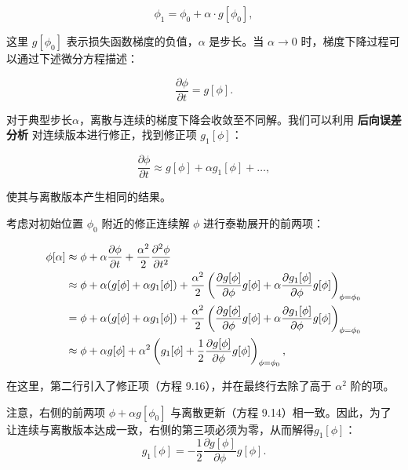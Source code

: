 \begin{equation}
\phi_1 = \phi_0 + \alpha \cdot g[\phi_0], 
\end{equation}

这里 \(g[\phi_0]\) 表示损失函数梯度的负值，\(\alpha\) 是步长。当 \(\alpha \rightarrow 0\) 时，梯度下降过程可以通过下述微分方程描述：

\begin{equation}
\frac{\partial \phi}{\partial t} = g[\phi]. 
\end{equation}

对于典型步长\(\alpha\)，离散与连续的梯度下降会收敛至不同解。我们可以利用 \textbf{后向误差分析} 对连续版本进行修正，找到修正项 \(g_1[\phi]\)：

\begin{equation}
\frac{\partial \phi}{\partial t} \approx g[\phi] + \alpha g_1[\phi] + \ldots, 
\end{equation}

使其与离散版本产生相同的结果。

考虑对初始位置  \(\phi_0\) 附近的修正连续解 \(\phi\) 进行泰勒展开的前两项：


\begin{align}
	\phi[\alpha] &\approx \phi + \alpha \frac{\partial \phi}{\partial t} + \frac{\alpha^2}{2} \frac{\partial^2 \phi}{\partial t^2} \notag \\
	&\approx \phi + \alpha (g[\phi] + \alpha g_1[\phi]) + \frac{\alpha^2}{2} \left( \frac{\partial g[\phi]}{\partial \phi} g[\phi] + \alpha \frac{\partial g_1[\phi]}{\partial \phi} g[\phi] \right)_{\phi=\phi_0} \notag \\
	&= \phi + \alpha (g[\phi] + \alpha g_1[\phi]) + \frac{\alpha^2}{2} \left( \frac{\partial g[\phi]}{\partial \phi} g[\phi] + \alpha \frac{\partial g_1[\phi]}{\partial \phi} g[\phi] \right)_{\phi=\phi_0} \notag \\
	&\approx \phi + \alpha g[\phi] + \alpha^2 \left( g_1[\phi] + \frac{1}{2} \frac{\partial g[\phi]}{\partial \phi} g[\phi] \right)_{\phi=\phi_0} , 
\end{align} 

在这里，第二行引入了修正项（方程 9.16），并在最终行去除了高于 \(\alpha^2\) 阶的项。

注意，右侧的前两项 \(\phi + \alpha g[\phi_0]\) 与离散更新（方程 9.14）相一致。因此，为了让连续与离散版本达成一致，右侧的第三项必须为零，从而解得\(g_1[\phi]\)：
\begin{equation}
g_1[\phi] = - \frac{1}{2} \frac{\partial g[\phi]}{\partial \phi} g[\phi]. 
\end{equation}

